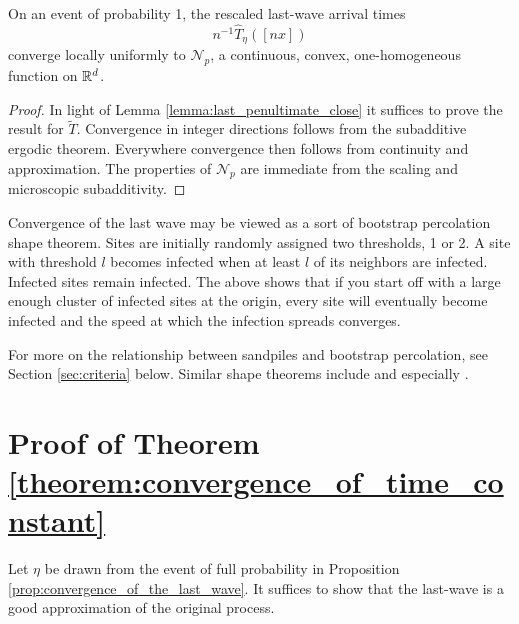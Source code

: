 \documentclass[12pt]{amsart}
\begin{document}
\begin{prop} \label{prop:convergence_of_the_last_wave}
	On an event of probability 1, the rescaled last-wave arrival times 
	\[
	n^{-1} \hat{T}_{\eta}([n x])
	\] 
	converge locally uniformly to $\mathcal{N}_{p}$, a continuous, convex, one-homogeneous function on $\mathbb{R}^d$. 
\end{prop}
\begin{proof}
	In light of Lemma \ref{lemma:last_penultimate_close} it suffices to prove the result
	for $\tilde{T}$. Convergence in integer directions follows from the subadditive ergodic theorem. 
	Everywhere convergence then follows from continuity and approximation. The properties of $\mathcal{N}_p$
	are immediate from the scaling and microscopic subadditivity.
\end{proof}

\begin{remark}
	Convergence of the last wave may be viewed as a sort of bootstrap percolation shape theorem. 
	Sites are initially randomly assigned two thresholds, 1 or 2. A site with threshold $l$
	becomes infected when at least $l$ of its neighbors are infected. Infected sites remain infected. 
	The above shows that if you start off with a large enough cluster of infected sites at the origin, every site will eventually become 
	infected and the speed at which the infection spreads converges. 
	
	For more on the relationship between sandpiles and bootstrap percolation, see Section \ref{sec:criteria} below. 
	Similar shape theorems include \cite{garet2012asymptotic, kesten2008shape,alves2002shape, cox1981some} and 
	especially \cite{willson1978convergence, gravner1993threshold,fey2010limiting}.
\end{remark}




\section{Proof of Theorem \ref{theorem:convergence_of_time_constant}} \label{sec:proof_of_theorem}
Let $\eta$ be drawn from the event of full probability in Proposition \ref{prop:convergence_of_the_last_wave}.
It suffices to show that the last-wave is a good approximation of the original process. 
\end{document}

